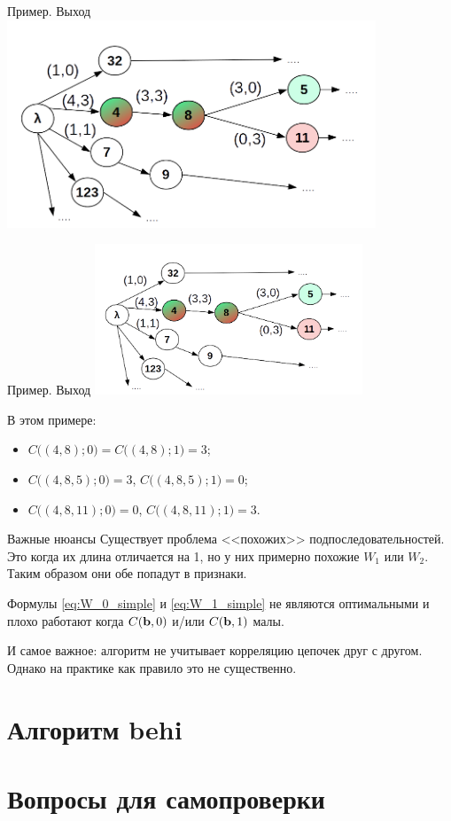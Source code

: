 \begin{frame}{Пример. Выход}
	\centering
	\includegraphics[width=11cm]{../pic/beh/D_example.png}
\end{frame}

\begin{frame}{Пример. Выход}
	\includegraphics[width=8cm]{../pic/beh/D_example.png}
	
	В этом примере:
	\begin{itemize}
		\item $C \big( (4,8); 0\big) =  C \big( (4,8); 1\big) = 3$;
		\item $C \big( (4,8,5); 0\big) = 3$, $C \big( (4,8,5); 1\big) = 0$;
		\item $C \big( (4,8,11); 0\big) = 0$, $C \big( (4,8,11); 1\big) = 3$.
	\end{itemize}
	
\end{frame}


\begin{frame}{Важные нюансы}
	Существует проблема <<похожих>> подпоследовательностей.
	Это когда их длина отличается на 1, но у них примерно похожие $W_1$ или $W_2$.
	Таким образом они обе попадут в признаки. 
	
	Формулы \eqref{eq:W_0_simple} и \eqref{eq:W_1_simple} не являются оптимальными 
	и плохо работают когда $C(\bold b, 0)$ и/или $C(\bold b, 1)$ малы.
	
	И самое важное: алгоритм не учитывает корреляцию цепочек друг с другом. 
	Однако на практике как правило это не существенно. 
\end{frame}








\section{Алгоритм behi}\label{section:behi}


\section{Вопросы для самопроверки}

